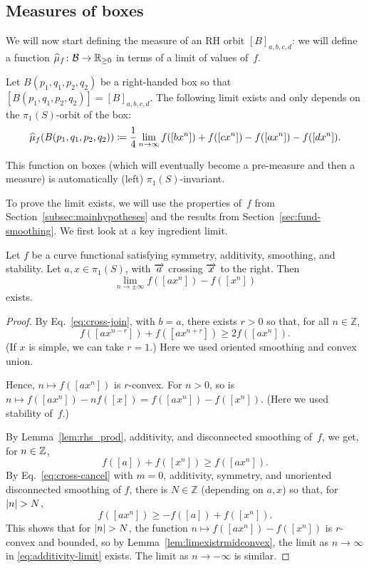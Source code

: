 \subsection{Measures of boxes}

We will now start defining the measure of an RH orbit $[B]_{a,b,c,d}$:
we will define a function
$\widehat{\mu}_f \colon \mathcal{B} \to \mathbb{R}_{\geq 0}$ in terms of a limit
of values of~$f$.

\begin{proposition}
\label{prop:limitexists}
Let $B(p_1,q_1,p_2,q_2)$ be a right-handed box so that $[B(p_1,q_1,p_2,q_2)]=[B]_{a,b,c,d}$.
The following limit exists and only depends on the $\pi_1(S)$-orbit
of the box:
\begin{equation}
\widehat{\mu}_{f}(B(p_1,q_1,p_2,q_2))\coloneqq\frac{1}{4}\lim_{n \to \infty}f([bx^n]) + f([cx^n])-f([ax^n]) - f([dx^n]).
\label{eq:def_measure}
\end{equation}
\end{proposition}
This function on boxes (which will eventually become a pre-measure and
then a measure) is automatically (left) $\pi_1(S)$-invariant.

To prove the limit exists, we
will use
the properties
of~$f$ from Section~\ref{subsec:mainhypotheses} and the
results from
Section~\ref{sec:fund-smoothing}.
We
first look at a key ingredient limit.

\begin{lemma}\label{lem:additivity-limit}
Let $f$ be a curve functional satisfying symmetry, additivity, smoothing, and
stability.
Let $a,x \in \pi_1(S)$, with $\overrightarrow{a}$ crossing $\overrightarrow{x}$ to the right. Then
  \begin{equation}\label{eq:additivity-limit}
    \lim_{n \to \pm\infty} f([a x^{n}]) - f([x^n])
  \end{equation}
  exists.
\end{lemma}

\begin{proof}
  By Eq.~\eqref{eq:cross-join}, with $b=a$, there exists $r>0$ so that, for all $n \in \mathbb{Z}$,
  \[
    f([ax^{n-r}]) + f([ax^{n+r}]) \geq 2 f([ax^n]).
  \]
  (If $x$ is simple, we can take $r=1$.) Here we used oriented smoothing and convex union.

  Hence, $n \mapsto f([a x^{n}])$ is $r$-convex. For $n > 0$, so is $n \mapsto f([a x^n]) - n f([x]) = f([a x^n]) - f([x^n])$. (Here we used stability of~$f$.)
 
  By Lemma~\ref{lem:rhs_prod}, additivity, and 
 disconnected smoothing of~$f$, we get, for $n \in \mathbb{Z}$,
 \[
 f([a]) + f([x^{n}]) \geq f([ax^{n}]).
 \]
 By Eq.~\eqref{eq:cross-cancel} with $m=0$,
additivity, symmetry, and unoriented disconnected
smoothing of $f$, there is $N \in \mathbb{Z}$ (depending on $a,x$) so that, for $\lvert n\rvert > N$,
  \[
    f([a x^{n}]) \ge -f([a]) + f([x^{ n}]).
  \] 
  This shows that for $\lvert n\rvert > N$, the function $n \mapsto f([ax^n]) - f([x^n])$ is $r$-convex and bounded, so by Lemma~\ref{lem:limexistrmidconvex}, the limit as $n \to \infty$ in \eqref{eq:additivity-limit} exists. The limit as $n \to -\infty$ is similar.
\end{proof}


